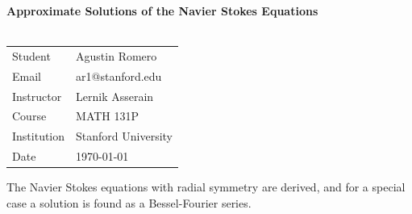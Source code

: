 \documentclass{article}
\begin{document}
\begin{center}
\textbf{\Large{Approximate Solutions of the Navier Stokes Equations}}\\~\\
\begin{tabular}{l l}
Student&Agustin Romero\\
Email&ar1@stanford.edu\\
Instructor&Lernik Asserain\\
Course&MATH 131P\\
Institution&Stanford University\\
Date&\today\\
\end{tabular}
\end{center}
\begin{abstract}
\end{abstract}
The Navier Stokes equations with radial symmetry are derived, and for a special case a solution is found as a Bessel-Fourier series.
\end{document}
